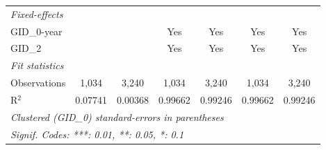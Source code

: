 \begin{tabular}{lcccccc}
   \midrule
   \emph{Fixed-effects}\\
   GID\_0-year        &               &                      & Yes                     & Yes                     & Yes                      & Yes\\  
   GID\_2             &               &                      & Yes                     & Yes                     & Yes                      & Yes\\  
   \midrule
   \emph{Fit statistics}\\
   Observations       & 1,034         & 3,240                & 1,034                   & 3,240                   & 1,034                    & 3,240\\  
   R$^2$              & 0.07741       & 0.00368              & 0.99662                 & 0.99246                 & 0.99662                  & 0.99246\\  
   \midrule \midrule
   \multicolumn{7}{l}{\emph{Clustered (GID\_0) standard-errors in parentheses}}\\
   \multicolumn{7}{l}{\emph{Signif. Codes: ***: 0.01, **: 0.05, *: 0.1}}\\
\end{tabular}
\par\endgroup



